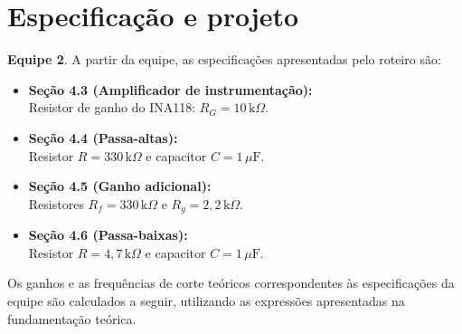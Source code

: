 \documentclass[11pt,a4paper]{article}
\begin{document}
\section{Especificação e projeto}


\begin{especbancada}
\textbf{Equipe 2}. A partir da equipe, as especificações apresentadas pelo roteiro são:

\begin{itemize}
    \item \textbf{Seção 4.3 (Amplificador de instrumentação):} \\
    Resistor de ganho do INA118: $R_G = 10\,\text{k}\Omega$.

    \vspace{0.3cm}
    \item \textbf{Seção 4.4 (Passa-altas):} \\
    Resistor $R = 330\,\text{k}\Omega$ e capacitor $C = 1\,\mu\text{F}$.

    \vspace{0.3cm}
    \item \textbf{Seção 4.5 (Ganho adicional):} \\
    Resistores $R_f = 330\,\text{k}\Omega$ e $R_g = 2{,}2\,\text{k}\Omega$.

    \vspace{0.3cm}
    \item \textbf{Seção 4.6 (Passa-baixas):} \\
    Resistor $R = 4{,}7\,\text{k}\Omega$ e capacitor $C = 1\,\mu\text{F}$.
\end{itemize}
\end{especbancada}

Os ganhos e as frequências de corte teóricos correspondentes às especificações da equipe são calculados a seguir, utilizando as expressões apresentadas na fundamentação teórica.
\end{document}
